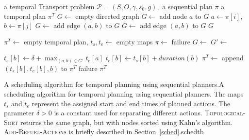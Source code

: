 %
{%
\Input a temporal Transport problem $\mathcal{P} = (S, O, \gamma, s_0, g),$
a sequential plan $\pi$
\Output a temporal plan $\pi^T$
\State $G \gets $ empty directed graph
\State $G \gets $ add node $a$ to $G$
\EndFor
{}
\State $a \gets \pi[i]$, $b \gets \pi[j]$
\State $G \gets $ add edge $(a, b)$ to $G$
\State $G \gets $ add edge $(a, b)$ to $G$
\EndIf
\EndFor
\EndFor
\State \Return $G$
\EndFunction

\State $\pi^T \gets $ empty temporal plan, $t_s, t_e \gets $ empty maps
\State $\pi \gets $ 
 \Return failure \EndIf
\State $G \gets $ 
\State $G' \gets $ 

\State $t_s[b] \gets \delta + \max_{(a, b) \in G'} t_e[a]$
\State $t_e[b] \gets t_s[b] + duration(b)$
\State $\pi^T \gets $ append $(t_s[b], t_e[b], b)$ to $\pi^T$
\EndFor
{}
\Return failure
\EndIf
\State \Return $\pi^T$
\EndFunction
}%
{A scheduling algorithm
for temporal planning using sequential planners.}{A scheduling algorithm
for temporal planning using sequential planners.
The maps $t_s$ and $t_e$ represent the assigned start and end times of planned actions. The parameter $\delta > 0$ is a constant used for separating different actions.
\textsc{Topological-Sort} returns the same graph, but with nodes sorted
using Kahn's algorithm.
\textsc{Add-Refuel-Actions} is briefly described in Section~\ref{sched}.}{sched}{tb}

